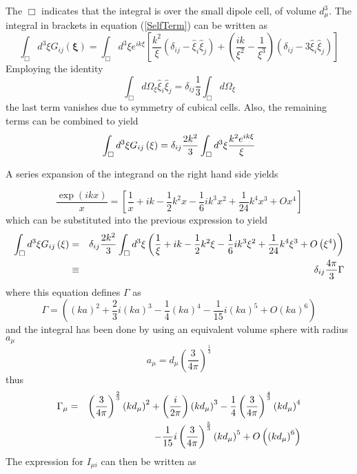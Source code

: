 \documentclass{article}
\begin{document}
The $\Box $ indicates that the integral is over the small dipole cell, of
volume $d_{\mu }^{3}.$ The integral in brackets in equation (\ref{SelfTerm})
can be written as 
\begin{equation}
\int_{\Box }d^{3}\xi G_{ij}\left( \mathbf{\xi }\right) =\int_{\Box }d^{3}\xi
e^{ik\xi }\left[ \frac{k^{2}}{\xi }\left( \delta _{ij}-\hat{\xi}_{i}\hat{\xi}%
_{j}\right) +\left( \frac{ik}{\xi ^{2}}-\frac{1}{\xi ^{3}}\right) \left(
\delta _{ij}-3\hat{\xi}_{i}\hat{\xi}_{j}\right) \right]
\end{equation}
Employing the identity 
\begin{equation}
\int_{\Box }d\Omega _{\xi }\hat{\xi}_{i}\hat{\xi}_{j}=\delta _{ij}\frac{1}{3}%
\int_{\Box }d\Omega _{\xi }
\end{equation}
the last term vanishes due to symmetry of cubical cells. Also, the remaining
terms can be combined to yield 
\begin{equation}
\int_{\Box }d^{3}\xi G_{ij}\left( \mathbf{\xi }\right) =\delta _{ij}\frac{%
2k^{2}}{3}\int_{\Box }d^{3}\xi \frac{k^{2}e^{ik\xi }}{\xi }
\end{equation}

A series expansion of the integrand on the right hand side yields

\begin{equation}
\frac{\exp (ikx)}{x}=\left[ \frac{1}{x}+ik-\frac{1}{2}k^{2}x-\frac{1}{6}%
ik^{3}x^{2}+\frac{1}{24}k^{4}x^{3}+Ox^{4}\right]
\end{equation}
which can be substituted into the previous expression to yield 
\begin{eqnarray}
\int_{\Box }d^{3}\xi G_{ij}\left( \mathbf{\xi }\right) &=&\delta _{ij}\frac{%
2k^{2}}{3}\int_{\Box }d^{3}\xi \left( \frac{1}{\xi }+ik-\frac{1}{2}k^{2}\xi -%
\frac{1}{6}ik^{3}\xi ^{2}+\frac{1}{24}k^{4}\xi ^{3}+O\left( \xi ^{4}\right)
\right)  \nonumber \\
&\equiv &\delta _{ij}\frac{4\pi }{3}\Gamma
\end{eqnarray}
where this equation defines $\Gamma $ as 
\begin{equation}
\Gamma =\left( \left( ka\right) ^{2}+\allowbreak \frac{2}{3}\allowbreak
i\left( ka\right) ^{3}-\frac{1}{4}\left( ka\right) ^{4}-\frac{1}{15}i\left(
ka\right) ^{5}+O\left( ka\right) ^{6}\right)
\end{equation}
and the integral has been done by using an equivalent volume sphere with
radius $a_{\mu }$ 
\begin{equation}
a_{\mu }=d_{\mu }\left( \frac{3}{4\pi }\right) ^{\frac{1}{3}}
\end{equation}
thus 
\begin{eqnarray}
\Gamma _{\mu } &=&\left( \frac{3}{4\pi }\right) ^{\frac{2}{3}}\left( kd_{\mu
}\right) ^{2}+\allowbreak \allowbreak \left( \frac{\allowbreak \allowbreak i%
}{2\pi }\right) \left( kd_{\mu }\right) ^{3}-\frac{1}{4}\left( \frac{3}{4\pi 
}\right) ^{\frac{4}{3}}\left( kd_{\mu }\right) ^{4}  \label{Gamma} \\
&&-\frac{1}{15}i\left( \frac{3}{4\pi }\right) ^{\frac{5}{3}}\left( kd_{\mu
}\right) ^{5}+O\left( \left( kd_{\mu }\right) ^{6}\right)  \nonumber
\end{eqnarray}
The expression for $I_{\mu i}$ can then be written as
\end{document}
